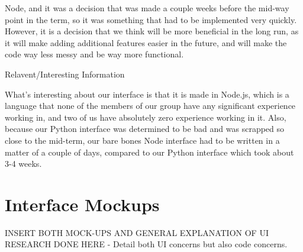 \documentclass[onecolumn, draftclsnofoot,10pt, compsoc]{IEEEtran}
\begin{document}
Node, and it was a decision that was made a couple weeks before the mid-way point in the term, so it was something that had to be implemented very quickly. However, it is a decision that we think will be more beneficial in the long run, as it will make adding additional features easier in the future, and will make the code way less messy and be way more functional.

Relavent/Interesting Information

What's interesting about our interface is that it is made in Node.js, which is a language that none of the members of our group have any significant experience working in, and two of us have absolutely zero experience working in it. Also, because our Python interface was determined to be bad and was scrapped so close to the mid-term, our bare bones Node interface had to be written in a matter of a couple of days, compared to our Python interface which took about 3-4 weeks.

\section{Interface Mockups}
INSERT BOTH MOCK-UPS AND GENERAL EXPLANATION OF UI RESEARCH DONE HERE - Detail both UI concerns but also code concerns. 


\end{document}

